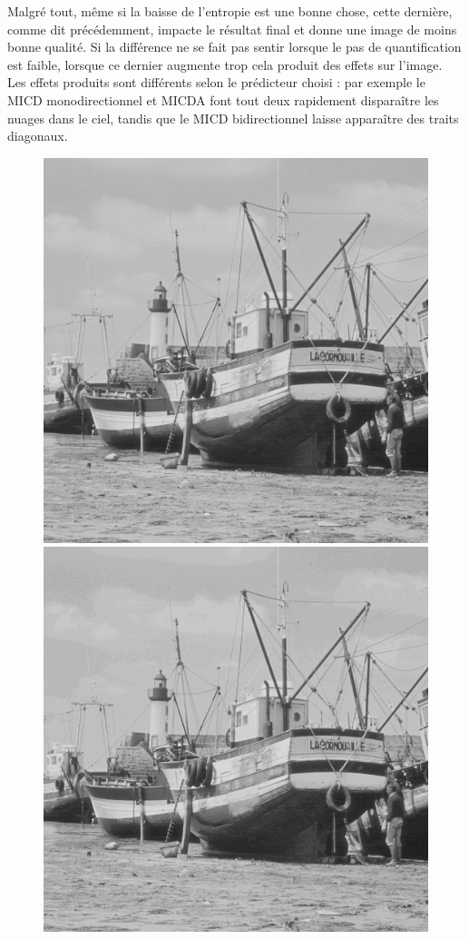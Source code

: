 \documentclass[12pt]{report}
\begin{document}
Malgré tout, même si la baisse de l'entropie est une bonne chose, cette dernière, comme dit précédemment, impacte le résultat final et donne une image de moins bonne qualité. Si la différence ne se fait pas sentir lorsque le pas de quantification est faible, lorsque ce dernier augmente trop cela produit des effets sur l'image. Les effets produits sont différents selon le prédicteur choisi : par exemple le MICD monodirectionnel et MICDA font tout deux rapidement disparaître les nuages dans le ciel, tandis que le MICD bidirectionnel laisse apparaître des traits diagonaux.

\begin{figure}[H]
\begin{center}
\includegraphics[scale=0.25]{../ImageRes/ImagedecodeeMICDmonoQ2.jpg} 
\includegraphics[scale=0.25]{../ImageRes/ImagedecodeeMICDmonoQ8.jpg} 

\end{center}
\end{figure}
\end{document}
